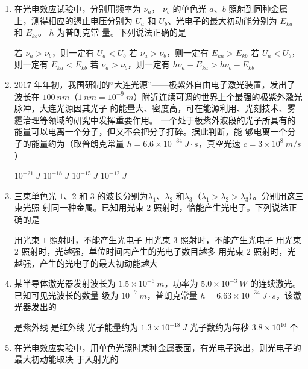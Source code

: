 \begin{enumerate}
\item 
{}
在光电效应试验中，分别用频率为 $ \nu_{a} $， $ \nu_{b} $ 的单色光 $ a $、$ b $ 照射到同种金属
上，测得相应的遏止电压分别为 $ U_{a} $ 和 $ U_{b} $、光电子的最大初动能分别为 $ E_{ka} $ 和 $ E_{kb} $。 $ h $ 为普朗克常
量。下列说法正确的是  

\fourchoices
{若 $ \nu_{a} > \nu_{b} $，则一定有 $ U_{a} < U_{b} $}
{若 $ \nu_{a} > \nu_{b} $，则一定有 $ E_{ka} > E_{kb} $}
{若 $ U_{a} < U_{b} $，则一定有 $ E_{ka} < E_{kb} $}
{若 $ \nu_{a} > \nu_{b} $，则一定有 $ h \nu_{a} - E_{ka} >h \nu_{b} - E_{kb} $}



\item 
{}
$ 2017 $ 年年初，我国研制的“大连光源”——极紫外自由电子激光装置，发出了
波长在 $ 100 \ nm $（$ 1 \ nm =10^{-9} \ m $）附近连续可调的世界上个最强的极紫外激光脉冲，大连光源因其光子
的能量大、密度高，可在能源利用、光刻技术、雾霾治理等领域的研究中发挥重要作用。
一个处于极紫外波段的光子所具有的能量可以电离一个分子，但又不会把分子打碎。据此判断，能
够电离一个分子的能量约为（取普朗克常量 $h=6.6 \times 10^{-34} \ J \cdot s$，真空光速 $c=3 \times 10^{8} \ m / s$ ）  

\fourchoices
{$ 10^{-21} \ J $}
{$ 10^{-18} \ J $}
{$ 10^{-15} \ J $}
{$ 10^{-12} \ J $}


\item 
{}
三束单色光 $ 1 $、$ 2 $ 和 $ 3 $ 的波长分别为$ \lambda_{1} $、$ \lambda_{2} $ 和$ \lambda_{3} $（$\lambda_{1}>\lambda_{2}>\lambda_{3}$）。分别用这三束光照
射同一种金属。已知用光束 $ 2 $ 照射时，恰能产生光电子。下列说法正确的是  

\fourchoices
{用光束 $ 1 $ 照射时，不能产生光电子}
{用光束 $ 3 $ 照射时，不能产生光电子}
{用光束 $ 2 $ 照射时，光越强，单位时间内产生的光电子数目越多}
{用光束 $ 2 $ 照射时，光越强，产生的光电子的最大初动能越大}


\item
{}
某半导体激光器发射波长为 $ 1.5 \times 10^{-6} \ m $，功率为 $ 5.0 \times 10^{-3} \ W $ 的连续激光。已知可见光波长的数量
级为 $ 10^{-7} \ m $，普朗克常量 $ h=6.63 \times 10^{-34} \ J \cdot s $，该激光器发出的  

\fourchoices
{是紫外线}
{是红外线}
{光子能量约为 $ 1.3 \times 10^{-18} \ J $}
{光子数约为每秒 $ 3.8 \times 10^{16} $ 个}



\item 
{}
在光电效应实验中，用单色光照时某种金属表面，有光电子逸出，则光电子的最大初动能取决
于入射光的  


\end{enumerate}
